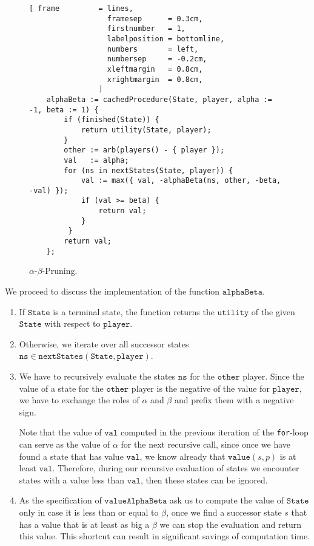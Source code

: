 \begin{figure}[!ht]
\centering
\begin{Verbatim}[ frame         = lines, 
                  framesep      = 0.3cm, 
                  firstnumber   = 1,
                  labelposition = bottomline,
                  numbers       = left,
                  numbersep     = -0.2cm,
                  xleftmargin   = 0.8cm,
                  xrightmargin  = 0.8cm,
                ]
    alphaBeta := cachedProcedure(State, player, alpha := -1, beta := 1) {
        if (finished(State)) {
            return utility(State, player);
        }
        other := arb(players() - { player });
        val   := alpha;
        for (ns in nextStates(State, player)) {
            val := max({ val, -alphaBeta(ns, other, -beta, -val) });
            if (val >= beta) {
                return val;
            }
         }
        return val;
    };
\end{Verbatim}
\vspace*{-0.3cm}
\caption{$\alpha$-$\beta$-Pruning.}
\label{fig:game-alpha-beta.stlx}
\end{figure}

We proceed to discuss the implementation of the function $\mathtt{alphaBeta}$.
\begin{enumerate}
\item If $\mathtt{State}$ is a terminal state, the function returns the $\mathtt{utility}$ of the given
      $\mathtt{State}$ with respect to $\mathtt{player}$.
\item Otherwise, we iterate over all successor states $\mathtt{ns} \in \mathtt{nextStates}(\mathtt{State}, \mathtt{player})$.
\item We have to recursively evaluate the states $\mathtt{ns}$ for the $\mathtt{other}$ player.
      Since the value of a state for the $\mathtt{other}$ player is the negative of the value for
      $\mathtt{player}$, we have to exchange the roles of $\alpha$ and $\beta$ and prefix them with a negative
      sign.

      Note that the value of $\mathtt{val}$ computed in the previous iteration of the \texttt{for}-loop 
      can serve as the value of $\alpha$ for the next recursive call, since once we have found a 
      state that has value $\mathtt{val}$, we know already that $\mathtt{value}(s,p)$ is at least
      $\mathtt{val}$.  Therefore, during our recursive evaluation of states we encounter states with a value
      less than $\mathtt{val}$, then these states can be ignored.
\item As the specification of $\mathtt{valueAlphaBeta}$ ask us to compute the value of $\mathtt{State}$ only in
      case it is less than or equal to $\beta$, once we find a successor state $s$ that has a
      value that is at least as big a $\beta$ we can stop the evaluation and return this value.
      This shortcut can result in significant savings of computation time.
\end{enumerate}

